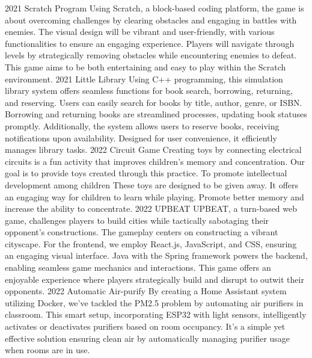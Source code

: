 \documentclass[9pt]{developercv} %
\begin{document}
\begin{entrylist}
    \entry
		{2021}
		{Scratch Program}
		{}
		{%
      Using Scratch, a block-based coding platform, the game is about overcoming challenges by clearing obstacles and engaging in battles with enemies. The visual design will be vibrant and user-friendly, with various functionalities to ensure an engaging experience. Players will navigate through levels by strategically removing obstacles while encountering enemies to defeat. This game aims to be both entertaining and easy to play within the Scratch environment.}
    \entry
		{2021}
		{Little Library}
		{}
		{%
        Using C++ programming, this simulation library system offers seamless functions for book search, borrowing, returning, and reserving. Users can easily search for books by title, author, genre, or ISBN. Borrowing and returning books are streamlined processes, updating book statuses promptly. Additionally, the system allows users to reserve books, receiving notifications upon availability. Designed for user convenience, it efficiently manages library tasks.}
    \entry
		{2022}
		{Circuit Game}
		{}
		{%
        Creating toys by connecting electrical circuits is a fun activity that improves children's memory and concentration. Our goal is to provide toys created through this practice. To promote intellectual development among children These toys are designed to be given away. It offers an engaging way for children to learn while playing. Promote better memory and increase the ability to concentrate.}
    \entry
		{2022}
		{UPBEAT}
		{}
		{%
        UPBEAT, a turn-based web game, challenges players to build cities while tactically sabotaging their opponent's constructions. The gameplay centers on constructing a vibrant cityscape. For the frontend, we employ React.js, JavaScript, and CSS, ensuring an engaging visual interface. Java with the Spring framework powers the backend, enabling seamless game mechanics and interactions. This game offers an enjoyable experience where players strategically build and disrupt to outwit their opponents.}
    \entry
		{2022}
		{Automatic Air-purify}
		{}
		{%
        By creating a Home Assistant system utilizing Docker, we've tackled the PM2.5 problem by automating air purifiers in classroom. This smart setup, incorporating ESP32 with light sensors, intelligently activates or deactivates purifiers based on room occupancy. It's a simple yet effective solution ensuring clean air by automatically managing purifier usage when rooms are in use.}

\end{entrylist}
\end{document}
